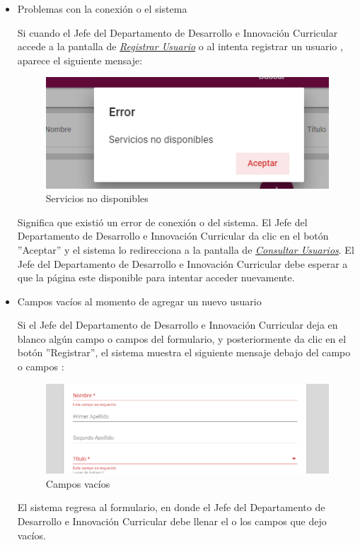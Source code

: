 \begin{itemize}
	\item Problemas con la conexión o el sistema
	
	Si cuando el Jefe del Departamento de Desarrollo e Innovación Curricular accede a la pantalla de \hyperlink{registrarUs-JDDIC}{\textit{Registrar Usuario}} o al intenta registrar un usuario , aparece el siguiente mensaje:
	
	\begin{figure}[H]
		\centering
		\includegraphics[width=0.4\linewidth]{images/SP5/MSGSN}
		\caption{Servicios no disponibles}
		\label{SND}
		
	\end{figure}
	
	Significa que existió un error de conexión o del sistema. El Jefe del Departamento de Desarrollo e Innovación Curricular da clic en el botón ''Aceptar'' y el sistema lo redirecciona  a la pantalla de \hyperlink{consultarUs-JDDIC}{\textit{Consultar Usuarios}}. El Jefe del Departamento de Desarrollo e Innovación Curricular debe esperar a que la página este disponible para intentar acceder nuevamente.
	
	\item Campos vacíos al momento de agregar un nuevo usuario
	
	Si el Jefe del Departamento de Desarrollo e Innovación Curricular deja en blanco algún campo o campos del formulario, y posteriormente da clic en el botón ''Registrar'', el sistema muestra el siguiente mensaje debajo del campo o campos :
	
	\begin{figure}[H]
		\centering
		\includegraphics[width=0.4\linewidth]{images/SP5/MSG44}
		\caption{Campos vacíos}
		\label{mensaje44-JDDIC}
	\end{figure}
	
	El sistema regresa al formulario, en donde el Jefe del Departamento de Desarrollo e Innovación Curricular debe llenar el o los campos que dejo vacíos.
	

\end{itemize}
